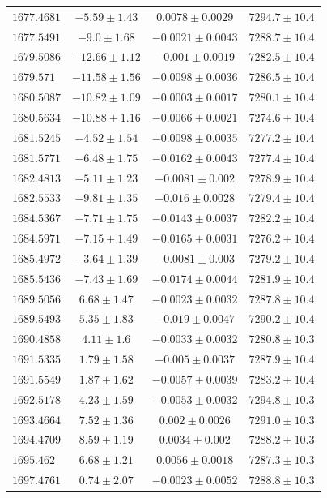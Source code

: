 \documentclass[fleqn,usenatbib]{mnras}
\begin{document}
\begin{table}
\begin{tabular}{lccc}
$1677.4681$ & $-5.59\pm1.43$ & $0.0078\pm0.0029$ & $7294.7\pm10.4$ \\
$1677.5491$ & $-9.0\pm1.68$ & $-0.0021\pm0.0043$ & $7288.7\pm10.4$ \\
$1679.5086$ & $-12.66\pm1.12$ & $-0.001\pm0.0019$ & $7282.5\pm10.4$ \\
$1679.571$ & $-11.58\pm1.56$ & $-0.0098\pm0.0036$ & $7286.5\pm10.4$ \\
$1680.5087$ & $-10.82\pm1.09$ & $-0.0003\pm0.0017$ & $7280.1\pm10.4$ \\
$1680.5634$ & $-10.88\pm1.16$ & $-0.0066\pm0.0021$ & $7274.6\pm10.4$ \\
$1681.5245$ & $-4.52\pm1.54$ & $-0.0098\pm0.0035$ & $7277.2\pm10.4$ \\
$1681.5771$ & $-6.48\pm1.75$ & $-0.0162\pm0.0043$ & $7277.4\pm10.4$ \\
$1682.4813$ & $-5.11\pm1.23$ & $-0.0081\pm0.002$ & $7278.9\pm10.4$ \\
$1682.5533$ & $-9.81\pm1.35$ & $-0.016\pm0.0028$ & $7279.4\pm10.4$ \\
$1684.5367$ & $-7.71\pm1.75$ & $-0.0143\pm0.0037$ & $7282.2\pm10.4$ \\
$1684.5971$ & $-7.15\pm1.49$ & $-0.0165\pm0.0031$ & $7276.2\pm10.4$ \\
$1685.4972$ & $-3.64\pm1.39$ & $-0.0081\pm0.003$ & $7279.2\pm10.4$ \\
$1685.5436$ & $-7.43\pm1.69$ & $-0.0174\pm0.0044$ & $7281.9\pm10.4$ \\
$1689.5056$ & $6.68\pm1.47$ & $-0.0023\pm0.0032$ & $7287.8\pm10.4$ \\
$1689.5493$ & $5.35\pm1.83$ & $-0.019\pm0.0047$ & $7290.2\pm10.4$ \\
$1690.4858$ & $4.11\pm1.6$ & $-0.0033\pm0.0032$ & $7280.8\pm10.3$ \\
$1691.5335$ & $1.79\pm1.58$ & $-0.005\pm0.0037$ & $7287.9\pm10.4$ \\
$1691.5549$ & $1.87\pm1.62$ & $-0.0057\pm0.0039$ & $7283.2\pm10.4$ \\
$1692.5178$ & $4.23\pm1.59$ & $-0.0053\pm0.0032$ & $7294.8\pm10.3$ \\
$1693.4664$ & $7.52\pm1.36$ & $0.002\pm0.0026$ & $7291.0\pm10.3$ \\
$1694.4709$ & $8.59\pm1.19$ & $0.0034\pm0.002$ & $7288.2\pm10.3$ \\
$1695.462$ & $6.68\pm1.21$ & $0.0056\pm0.0018$ & $7287.3\pm10.3$ \\
$1697.4761$ & $0.74\pm2.07$ & $-0.0023\pm0.0052$ & $7288.8\pm10.3$ \\

\end{tabular}
\end{table}
\end{document}
